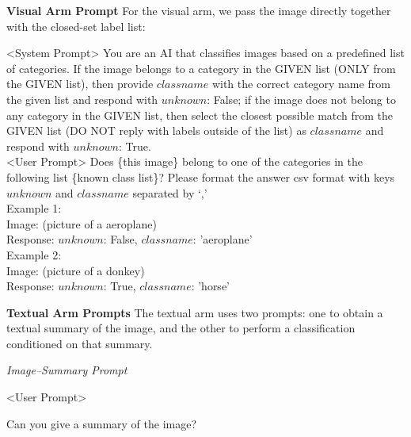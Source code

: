 \documentclass[10pt]{article} %
\begin{document}
\textbf{Visual Arm Prompt}
For the visual arm, we pass the image directly together with the closed-set label list:
\begin{promptquote}
<System Prompt> You are an AI that classifies images based on a predefined list of categories. 
If the image belongs to a category in the GIVEN list (ONLY from the GIVEN list), 
then provide $classname$ with the correct category name from the given list 
and respond with $unknown$: False; 
if the image does not belong to any category in the GIVEN list, 
then select the closest possible match from the GIVEN list 
(DO NOT reply with labels outside of the list) 
as $classname$ and respond with $unknown$: True.\\

<User Prompt> Does \{this image\} belong to one of the categories in the following list \{known class list\}? Please format the answer csv format with keys $unknown$ and $class name$ separated by `,' \\
Example 1:\\
Image: (picture of a aeroplane)\\
Response: $unknown$: False, $class name$: 'aeroplane'\\
Example 2:\\
Image: (picture of a donkey)\\
Response: $unknown$: True, $class name$: 'horse'
\end{promptquote}

\textbf{Textual Arm Prompts}
The textual arm uses two prompts: one to obtain a textual summary of the image, and the other to perform a classification conditioned on that summary.

{\em Image–Summary Prompt}
\begin{promptquote}
<User Prompt> 

Can you give a summary of the image?
\end{promptquote}
\end{document}

